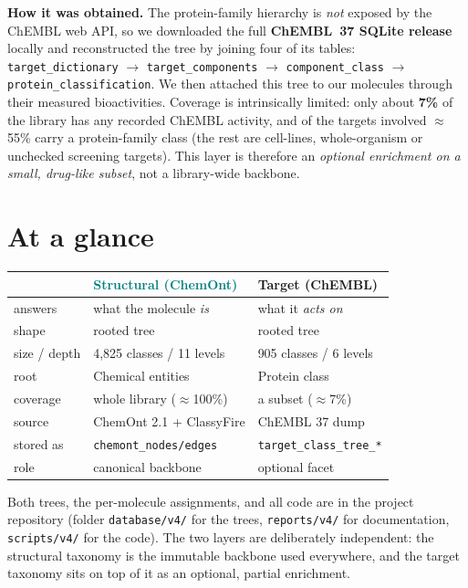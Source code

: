 \documentclass[11pt]{article}
\newcommand{\code}[1]{\texttt{\small #1}}
\begin{document}
\textbf{How it was obtained.} The protein-family hierarchy is \emph{not} exposed by the ChEMBL web
API, so we downloaded the full \textbf{ChEMBL~37 SQLite release} locally and reconstructed the
tree by joining four of its tables:
\code{target\_dictionary} $\rightarrow$ \code{target\_components} $\rightarrow$
\code{component\_class} $\rightarrow$ \code{protein\_classification}. We then attached this tree
to our molecules through their measured bioactivities. Coverage is intrinsically limited: only
about \textbf{7\%} of the library has any recorded ChEMBL activity, and of the targets involved
$\approx$55\% carry a protein-family class (the rest are cell-lines, whole-organism or unchecked
screening targets). This layer is therefore an \emph{optional enrichment on a small, drug-like
subset}, not a library-wide backbone.

\section*{At a glance}
\begin{center}
\footnotesize
\setlength{\tabcolsep}{4pt}
\renewcommand{\arraystretch}{1.2}
\begin{tabular}{lll}
\toprule
 & \textbf{\textcolor{teal}{Structural (ChemOnt)}} & \textbf{\textcolor{amber}{Target (ChEMBL)}} \\
\midrule
answers & what the molecule \emph{is} & what it \emph{acts on} \\
shape & rooted tree & rooted tree \\
size / depth & 4{,}825 classes / 11 levels & 905 classes / 6 levels \\
root & Chemical entities & Protein class \\
coverage & whole library ($\approx$100\%) & a subset ($\approx$7\%) \\
source & ChemOnt 2.1 + ClassyFire & ChEMBL 37 dump \\
stored as & \code{chemont\_nodes/edges} & \code{target\_class\_tree\_*} \\
role & canonical backbone & optional facet \\
\bottomrule
\end{tabular}
\end{center}

\vspace{2pt}
{\footnotesize Both trees, the per-molecule assignments, and all code are in the project
repository (folder \code{database/v4/} for the trees, \code{reports/v4/} for documentation,
\code{scripts/v4/} for the code). The two layers are deliberately independent: the structural
taxonomy is the immutable backbone used everywhere, and the target taxonomy sits on top of it as
an optional, partial enrichment.}
\end{document}
